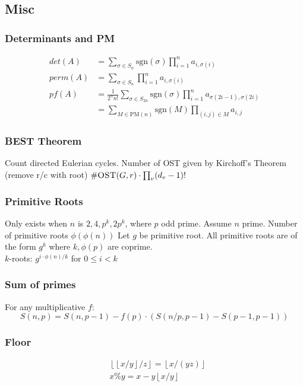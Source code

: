   \subsection{Misc}
    \subsubsection{Determinants and PM}
      \begin{align*}
        det(A) &= \sum_{\sigma \in S_n}\text{sgn}(\sigma)\prod_{i = 1}^n a_{i,\sigma(i)}\\
        perm(A) &= \sum_{\sigma \in S_n} \prod_{i = 1}^n a_{i,\sigma(i)}\\
        pf(A) &= \frac{1}{2^nn!}\sum_{\sigma \in S_{2n}} \text{sgn}(\sigma)\prod_{i = 1}^n a_{\sigma(2i-1),\sigma(2i)}\\ &= \sum_{M \in \text{PM}(n)} \text{sgn}(M) \prod_{(i,j) \in M} a_{i,j}
      \end{align*}

    \subsubsection{BEST Theorem}
      Count directed Eulerian cycles. Number of OST given by
      Kirchoff's Theorem (remove r/c with root) $\#\textsc{OST}(G,r)
      \cdot \prod_{v}(d_v-1)!$

    \subsubsection{Primitive Roots}
      Only exists when $n$ is $2, 4, p^k, 2p^k$, where $p$ odd prime. Assume
      $n$ prime. Number of primitive roots $\phi(\phi(n))$
      Let $g$ be primitive root. All primitive roots are of the form $g^k$
      where $k,\phi(p)$ are coprime.\\ $k$-roots:
      $g^{i \cdot \phi(n) / k}$ for $0 \leq i < k$

    \subsubsection{Sum of primes} For any multiplicative $f$:
      \[
          S(n,p) = S(n, p-1) - f(p) \cdot (S(n/p,p-1) - S(p-1,p-1))
      \]

    \subsubsection{Floor}
      \begin{align*}
          &\left\lfloor \left\lfloor x/y \right\rfloor / z \right\rfloor = \left\lfloor x / (yz) \right\rfloor \\
          &x \% y = x - y \left\lfloor x / y \right\rfloor
      \end{align*}


